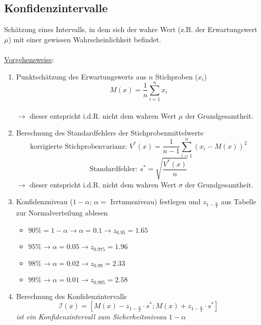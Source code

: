 \subsection{Konfidenzintervalle}

Schätzung eines Intervalls, in dem sich der wahre Wert (z.B. der Erwartungswert~\(\mu\)) mit einer gewissen Wahrscheinlichkeit befindet.
\\\\
\underline{Vorgehensweise}:
\begin{enumerate}
    \item Punktschätzung des Erwartungswerts aus \(n\) Stichproben (\(x_i\))
            \[M(x)=\frac{1}{n}\sum_{i=1}^{n}x_i\]\\
            \(\rightarrow\) dieser entspricht i.d.R. nicht dem wahren Wert \(\mu\) der Grundgesamtheit.
    \item Berechnung des Standardfehlers der Stichprobenmittelwerte
            \[\text{korrigierte Stichprobenvarianz: }V^*(x)=\frac{1}{n-1}\sum_{i=1}^{n}(x_i-M(x))^2\]
            \[\text{Standardfehler: }s^*=\sqrt{\frac{V^*(x)}{n}}\]
            \(\rightarrow\) dieser entspricht i.d.R. nicht dem wahren Wert \(\sigma\) der Grundgesamtheit.
    \item Konfidenzniveau (\(1-\alpha\); \(\alpha=\) Irrtumsniveau) festlegen und \(z_{1-\frac{\alpha}{2}}\) aus Tabelle zur Normalverteilung ablesen
        \begin{itemize}
            \item \(90\% = 1-\alpha \rightarrow \alpha=0.1\rightarrow z_{0.95}=1.65\)
            \item \(95\% \rightarrow \alpha=0.05\rightarrow z_{0.975}=1.96\)
            \item \(98\% \rightarrow \alpha=0.02\rightarrow z_{0.99}=2.33\)
            \item \(99\% \rightarrow \alpha=0.01\rightarrow z_{0.995}=2.58\)
        \end{itemize}
    \item Berechnung des Konfidenzintervalls
    \begin{equation*}
        \mathcal{I}(x) = \left[M(x) - z_{1-\frac{\alpha}{2}} \cdot s^*; M(x) + z_{1-\frac{\alpha}{2}} \cdot s^*\right]
    \end{equation*}
    \emph{ist ein Konfidenzintervall zum Sicherheitsniveau \(1-\alpha\)}
\end{enumerate}